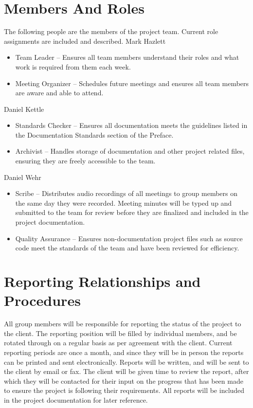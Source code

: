 \documentclass[letterpaper,12pt]{report}
\begin{document}
\section{Members And Roles}
The following people are the members of the project team.  Current role assignments are included and described.\newline
\newline
Mark Hazlett
\begin{itemize}
\item Team Leader – Ensures all team members understand their roles and what work is required from them each week.
\item Meeting Organizer – Schedules future meetings and ensures all team members are aware and able to attend.
\end{itemize}
Daniel Kettle
\begin{itemize}
\item Standards Checker – Ensures all documentation meets the guidelines listed in the Documentation Standards section of the Preface.
\item Archivist – Handles storage of documentation and other project related files, ensuring they are freely accessible to the team.
\end{itemize}
\pagebreak
Daniel Wehr
\begin{itemize}
 \item Scribe – Distributes audio recordings of all meetings to group members on the same day they were recorded.  Meeting minutes will be typed up and submitted to the team for review before they are finalized and included in the project documentation.
 \item Quality Assurance – Ensures non-documentation project files such as source code meet the standards of the team and have been reviewed for efficiency.
\end{itemize}

\section{Reporting Relationships and Procedures}
\hspace{1cm}All group members will be responsible for reporting the status of the project to the client. The reporting position will be filled by individual members, and be rotated through on a regular basis as per agreement with the client. Current reporting periods are once a month, and since they will be in person the reports can be printed and sent electronically. Reports will be written, and will be sent to the client by email or fax.  The client will be given time to review the report, after which they will be contacted for their input on the progress that has been made to ensure the project is following their requirements.  All reports will be included in the project documentation for later reference.
\pagebreak
\end{document}
